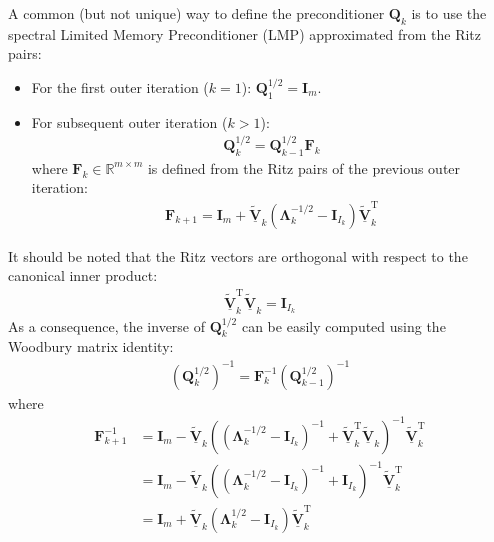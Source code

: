 \documentclass[12pt]{scrartcl}
\begin{document}
A common (but not unique) way to define the preconditioner $\mathbf{Q}_k$ is to use the spectral Limited Memory Preconditioner (LMP) approximated from the Ritz pairs:
\begin{itemize}
\item For the first outer iteration ($k=1$): $\mathbf{Q}^{1/2}_1 = \mathbf{I}_m$.
\item For subsequent outer iteration ($k>1$):
\begin{align}
\mathbf{Q}^{1/2}_k = \mathbf{Q}^{1/2}_{k-1} \mathbf{F}_k
\end{align}
where $\mathbf{F}_k \in \mathbb{R}^{m \times m}$ is defined from the Ritz pairs of the previous outer iteration:
\begin{align}
\mathbf{F}_{k+1} = \mathbf{I}_m+\underline{\widetilde{\mathbf{V}}}_k \left(\mathbf{\Lambda}_k^{-1/2} - \mathbf{I}_{I_k}\right) \underline{\widetilde{\mathbf{V}}}_k^\mathrm{T}
\end{align}
\end{itemize}
It should be noted that the Ritz vectors are orthogonal with respect to the canonical inner product:
\begin{align}
\underline{\widetilde{\mathbf{V}}}_k^\mathrm{T} \underline{\widetilde{\mathbf{V}}}_k = \mathbf{I}_{I_k}
\end{align}
As a consequence, the inverse of $\mathbf{Q}^{1/2}_k$ can be easily computed using the Woodbury matrix identity:
\begin{align}
\left(\mathbf{Q}^{1/2}_k\right)^{-1} = \mathbf{F}_k^{-1} \left(\mathbf{Q}^{1/2}_{k-1}\right)^{-1}
\end{align}
where
\begin{align}
\mathbf{F}_{k+1}^{-1} & = \mathbf{I}_m-\underline{\widetilde{\mathbf{V}}}_k \left(\left(\mathbf{\Lambda}_k^{-1/2} - \mathbf{I}_{I_k}\right)^{-1}+\underline{\widetilde{\mathbf{V}}}_k^\mathrm{T} \underline{\widetilde{\mathbf{V}}}_k\right)^{-1} \underline{\widetilde{\mathbf{V}}}_k^\mathrm{T} \nonumber \\
& = \mathbf{I}_m-\underline{\widetilde{\mathbf{V}}}_k \left(\left(\mathbf{\Lambda}_k^{-1/2} - \mathbf{I}_{I_k}\right)^{-1}+\mathbf{I}_{I_k}\right)^{-1} \underline{\widetilde{\mathbf{V}}}_k^\mathrm{T} \nonumber \\
& = \mathbf{I}_m+\underline{\widetilde{\mathbf{V}}}_k \left(\mathbf{\Lambda}_k^{1/2}-\mathbf{I}_{I_k}\right) \underline{\widetilde{\mathbf{V}}}_k^\mathrm{T}
\end{align}
\end{document}
